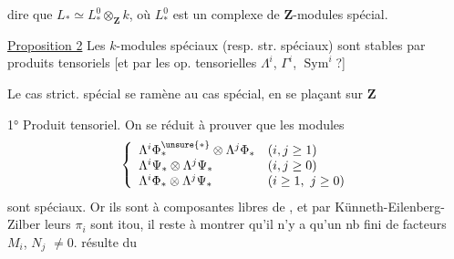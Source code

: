 dire que $L_*\simeq L^0_*\otimes_{\mathbf Z}k$, où $L^0_*$
est un complexe de $\mathbf Z$-modules 
spécial.

\uline{Proposition 2} Les $k$-modules  spéciaux
(resp. str. spéciaux) sont stables par
produits tensoriels [et par les op.
tensorielles $\Lambda^i$, $\Gamma^i$, $\operatorname{Sym}^i$?]

Le cas strict. spécial se ramène
au cas spécial, en se plaçant sur $\mathbf Z$\unsure{\ldots}

1° Produit tensoriel. On se réduit
à prouver que les modules
\[
\left\{\begin{array}{ll}
\Lambda^i\Phi_*^{\unsure{*}}\otimes\Lambda^j\Phi_* &(i,j\geq1)\\
\Lambda^i\Psi_*\otimes\Lambda^j\Psi_* &(i,j\geq0)\\
\Lambda^i\Phi_*\otimes\Lambda^j\Psi_* &(i\geq1,\ j\geq0)
\end{array}\right.
\]
sont spéciaux. Or ils sont à composantes
libres de , et par Künneth-Eilenberg-
Zilber leurs $\pi_i$ sont itou, il reste à
montrer qu'il n'y a qu'un nb fini
de facteurs $M_i$, $N_j$ $\neq0$.  
 résulte du

